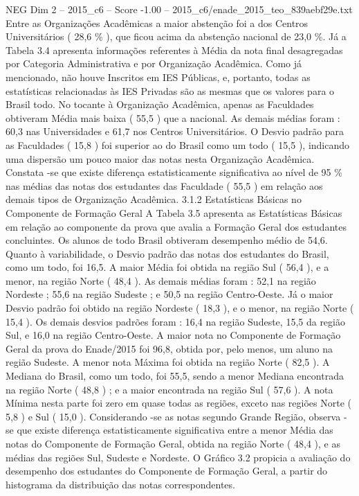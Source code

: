 \begin{textsample}{NEG Dim 2 – 2015\_c6 – Score -1.00 – 2015\_c6/enade\_2015\_teo\_839aebf29e.txt}
Entre as Organizações Acadêmicas a maior abstenção foi a dos Centros Universitários ( 28,6 \% ), que ficou acima da abstenção nacional de 23,0 \%.
Já a Tabela 3.4 apresenta informações referentes à Média da nota final desagregadas por Categoria Administrativa e por Organização Acadêmica.
Como já mencionado, não houve Inscritos em IES Públicas, e, portanto, todas as estatísticas relacionadas às IES Privadas são as mesmas que os valores para o Brasil todo.
No tocante à Organização Acadêmica, apenas as Faculdades obtiveram Média mais baixa ( 55,5 ) que a nacional.
As demais médias foram : 60,3 nas Universidades e 61,7 nos Centros Universitários.
O Desvio padrão para as Faculdades ( 15,8 ) foi superior ao do Brasil como um todo ( 15,5 ), indicando uma dispersão um pouco maior das notas nesta Organização Acadêmica.
Constata -se que existe diferença estatisticamente significativa ao nível de 95 \% nas médias das notas dos estudantes das Faculdade ( 55,5 ) em relação aos demais tipos de Organização Acadêmica. 3.1.2 Estatísticas Básicas no Componente de Formação Geral A Tabela 3.5 apresenta as Estatísticas Básicas em relação ao componente da prova que avalia a Formação Geral dos estudantes concluintes.
Os alunos de todo Brasil obtiveram desempenho médio de 54,6.
Quanto à variabilidade, o Desvio padrão das notas dos estudantes do Brasil, como um todo, foi 16,5.
A maior Média foi obtida na região Sul ( 56,4 ), e a menor, na região Norte ( 48,4 ).
As demais médias foram : 52,1 na região Nordeste ; 55,6 na região Sudeste ; e 50,5 na região Centro-Oeste.
Já o maior Desvio padrão foi obtido na região Nordeste ( 18,3 ), e o menor, na região Norte ( 15,4 ).
Os demais desvios padrões foram : 16,4 na região Sudeste, 15,5 da região Sul, e 16,0 na região Centro-Oeste.
A maior nota no Componente de Formação Geral da prova do Enade/2015 foi 96,8, obtida por, pelo menos, um aluno na região Sudeste.
A menor nota Máxima foi obtida na região Norte ( 82,5 ).
A Mediana do Brasil, como um todo, foi 55,5, sendo a menor Mediana encontrada na região Norte ( 48,8 ) ; e a maior encontrada na região Sul ( 57,6 ).
A nota Mínima nesta parte foi zero em quase todas as regiões, exceto nas regiões Norte ( 5,8 ) e Sul ( 15,0 ).
Considerando -se as notas segundo Grande Região, observa -se que existe diferença estatisticamente significativa entre a menor Média das notas do Componente de Formação Geral, obtida na região Norte ( 48,4 ), e as médias das regiões Sul, Sudeste e Nordeste.
O Gráfico 3.2 propicia a avaliação do desempenho dos estudantes do Componente de Formação Geral, a partir do histograma da distribuição das notas correspondentes.

\end{textsample}
